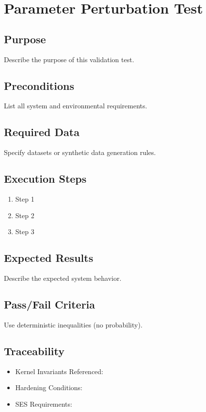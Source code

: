 

\section*{Parameter Perturbation Test}

\subsection*{Purpose}
Describe the purpose of this validation test.

\subsection*{Preconditions}
List all system and environmental requirements.

\subsection*{Required Data}
Specify datasets or synthetic data generation rules.

\subsection*{Execution Steps}
\begin{enumerate}
    \item Step 1
    \item Step 2
    \item Step 3
\end{enumerate}

\subsection*{Expected Results}
Describe the expected system behavior.

\subsection*{Pass/Fail Criteria}
Use deterministic inequalities (no probability).

\subsection*{Traceability}
\begin{itemize}
    \item Kernel Invariants Referenced:
    \item Hardening Conditions:
    \item SES Requirements:
\end{itemize}
